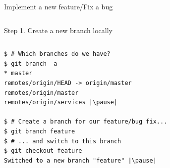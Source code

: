 \begin{frame}[fragile]{Implement a new feature/Fix a bug}
\begin{columns}
\begin{column}{0.4\textwidth}
\begin{center}
		\end{center}
	\end{column}
\end{columns}
\end{frame}


\begin{frame}[fragile]{Step 1. Create a new branch locally}
\begin{columns}
	\begin{column}{0.6\textwidth}
	\begin{lstlisting}
$ # Which branches do we have?
$ git branch -a
* master
remotes/origin/HEAD -> origin/master
remotes/origin/master
remotes/origin/services |\pause|

$ # Create a branch for our feature/bug fix...
$ git branch feature
$ # ... and switch to this branch
$ git checkout feature 
Switched to a new branch "feature" |\pause|


\end{lstlisting}
\end{column}
\end{columns}
\end{frame}
